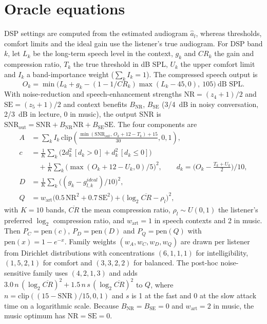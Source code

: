 \documentclass[preprint,12pt]{elsarticle}
\begin{document}
\section{Oracle equations}
\label{app:oracle}

DSP settings are computed from the estimated audiogram $\hat a_l$, whereas thresholds, comfort limits and the ideal gain use the listener's true audiogram. For DSP band $k$, let $L_k$ be the long-term speech level in the context, $g_k$ and $CR_k$ the gain and compression ratio, $T_k$ the true threshold in dB SPL, $U_k$ the upper comfort limit and $I_k$ a band-importance weight ($\sum_k I_k=1$). The compressed speech output is
\begin{equation}
 O_k=\min\!\big(L_k+g_k-(1-1/CR_k)\max(L_k-45,0),\ 105\big)\ \text{dB SPL}.
\end{equation}
With noise-reduction and speech-enhancement strengths $\mathrm{NR}=(z_4+1)/2$ and $\mathrm{SE}=(z_5+1)/2$ and context benefits $B_{\mathrm{NR}}$, $B_{\mathrm{SE}}$ (3/4~dB in noisy conversation, 2/3~dB in lecture, 0 in music), the output SNR is $\mathrm{SNR}_{\mathrm{out}}=\mathrm{SNR}+B_{\mathrm{NR}}\mathrm{NR}+B_{\mathrm{SE}}\mathrm{SE}$. The four components are
\begin{align}
 A &= \textstyle\sum_k I_k\,\mathrm{clip}\!\left(\frac{\min(\mathrm{SNR}_{\mathrm{out}},\,O_k+12-T_k)+15}{30},0,1\right),\\
 c &= \tfrac{1}{K}\textstyle\sum_k \big(2d_k^2\,[d_k>0]+d_k^2\,[d_k\le0]\big)\nonumber\\
   &\quad+\tfrac{1}{K}\textstyle\sum_k \big(\max(O_k+12-U_k,0)/5\big)^2,\qquad d_k=\big(O_k-\tfrac{T_k+U_k}{2}\big)/10,\\
 D &= \tfrac{1}{K}\textstyle\sum_k\big((g_k-g^{ideal}_{l,k})/10\big)^2,\\
 Q &= w_{\mathrm{art}}\big(0.5\,\mathrm{NR}^2+0.7\,\mathrm{SE}^2\big)+\big(\log_2\overline{CR}-\rho_l\big)^2,
\end{align}
with $K=10$ bands, $\overline{CR}$ the mean compression ratio, $\rho_l\sim U(0,1)$ the listener's preferred $\log_2$ compression ratio, and $w_{\mathrm{art}}=1$ in speech contexts and 2 in music. Then $P_C=\mathrm{pen}(c)$, $P_D=\mathrm{pen}(D)$ and $P_Q=\mathrm{pen}(Q)$ with $\mathrm{pen}(x)=1-e^{-x}$. Family weights $(w_A,w_C,w_D,w_Q)$ are drawn per listener from Dirichlet distributions with concentrations $(6,1,1,1)$ for intelligibility, $(1,5,2,1)$ for comfort and $(3,3,2,2)$ for balanced. The post-hoc noise-sensitive family uses $(4,2,1,3)$ and adds $3.0\,n\,(\log_2\overline{CR})^2+1.5\,n\,s\,(\log_2\overline{CR})^2$ to $Q$, where $n=\mathrm{clip}((15-\mathrm{SNR})/15,0,1)$ and $s$ is 1 at the fast and 0 at the slow attack time on a logarithmic scale. Because $B_{\mathrm{NR}}=B_{\mathrm{SE}}=0$ and $w_{\mathrm{art}}=2$ in music, the music optimum has $\mathrm{NR}=\mathrm{SE}=0$.



\end{document}
